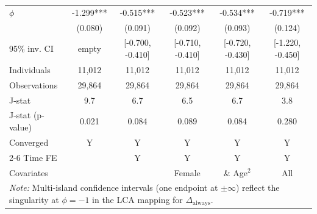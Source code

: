 \begin{tabular}{l ccccc}
\addlinespace
$\phi$              &      -1.299***&      -0.515***&      -0.523***&      -0.534***&      -0.719***\\
                    &     (0.080)   &     (0.091)   &     (0.092)   &     (0.093)   &     (0.124)   \\
95\% inv. CI        &       empty   &[-0.700, -0.410]   &[-0.710, -0.410]   &[-0.720, -0.430]   &[-1.220, -0.450]   \\
Individuals         &      11,012   &      11,012   &      11,012   &      11,012   &      11,012   \\
Observations        &      29,864   &      29,864   &      29,864   &      29,864   &      29,864   \\
J-stat              &         9.7   &         6.7   &         6.5   &         6.7   &         3.8   \\
J-stat (p-value)    &       0.021   &       0.084   &       0.089   &       0.084   &       0.280   \\
Converged           &           Y   &           Y   &           Y   &           Y   &           Y   \\
\cmidrule{2-6} Time FE & & Y & Y & Y & Y \\ Covariates & & & Female & \& Age$^2$ & All \\ \multicolumn{6}{p{\linewidth}}{\footnotesize \emph{Note:} Multi-island confidence intervals (one endpoint at $\pm\infty$) reflect the singularity at $\phi=-1$ in the LCA mapping for $\Delta_{\text{always}}$.} \\ \bottomrule \end{tabular}
